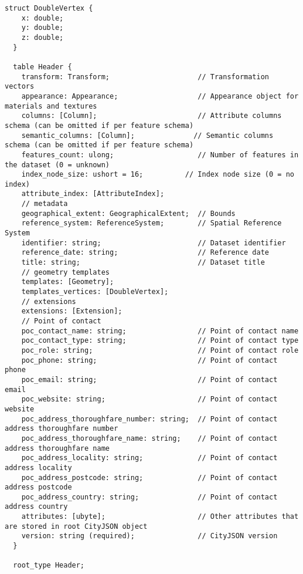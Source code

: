 \begin{lstlisting}[caption={Header schema},  basicstyle=\small]
  struct DoubleVertex {
    x: double;
    y: double;
    z: double;
  }

  table Header {
    transform: Transform;                     // Transformation vectors
    appearance: Appearance;                   // Appearance object for materials and textures
    columns: [Column];                        // Attribute columns schema (can be omitted if per feature schema)
    semantic_columns: [Column];              // Semantic columns schema (can be omitted if per feature schema)
    features_count: ulong;                    // Number of features in the dataset (0 = unknown)
    index_node_size: ushort = 16;          // Index node size (0 = no index)
    attribute_index: [AttributeIndex];
    // metadata
    geographical_extent: GeographicalExtent;  // Bounds
    reference_system: ReferenceSystem;        // Spatial Reference System
    identifier: string;                       // Dataset identifier
    reference_date: string;                   // Reference date
    title: string;                            // Dataset title
    // geometry templates
    templates: [Geometry];
    templates_vertices: [DoubleVertex];
    // extensions
    extensions: [Extension];
    // Point of contact
    poc_contact_name: string;                 // Point of contact name
    poc_contact_type: string;                 // Point of contact type
    poc_role: string;                         // Point of contact role
    poc_phone: string;                        // Point of contact phone
    poc_email: string;                        // Point of contact email
    poc_website: string;                      // Point of contact website
    poc_address_thoroughfare_number: string;  // Point of contact address thoroughfare number
    poc_address_thoroughfare_name: string;    // Point of contact address thoroughfare name
    poc_address_locality: string;             // Point of contact address locality
    poc_address_postcode: string;             // Point of contact address postcode
    poc_address_country: string;              // Point of contact address country
    attributes: [ubyte];                      // Other attributes that are stored in root CityJSON object
    version: string (required);               // CityJSON version
  }

  root_type Header;
\end{lstlisting}

